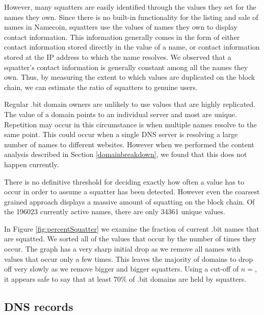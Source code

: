 However, many squatters are easily identified through the values they set for the names they own. Since there is no built-in functionality for the listing and sale of names in Namecoin, squatters use the values of names they own to display contact information. This information generally comes in the form of either contact information stored directly in the value of a name, or contact information stored at the IP address to which the name resolves.  We observed that a squatter's contact information is generally constant among all the names they own. Thus, by measuring the extent to which values are duplicated on the block chain, we can estimate the ratio of squatters to genuine users.

Regular .bit domain owners are unlikely to use values that are highly replicated. The value of a domain points to an individual server and most are unique. Repetition may occur in this circumstance is when multiple names resolve to the same point. This could occur when a single DNS server is resolving a large number of names to different websites. However when we performed the content analysis described in Section \ref{domainbreakdown}, we found that this does not happen currently.

There is no definitive threshold for deciding exactly how often a value has to occur in order to assume a squatter has been detected. However even the coarsest grained approach displays a massive amount of squatting on the block chain. Of the 196023 currently active names, there are only 34361 unique values.

In Figure \ref{fig:percentSquatter} we examine the fraction of current .bit names that are squatted. We sorted all of the values that occur by the number of times they occur. 
The graph has a very sharp initial drop as we remove all names with values that occur only a few times. This leaves the majority of domains to drop off very slowly as we remove bigger and bigger squatters. Using a cut-off of $n=$, it appears safe to say that at least 70\% of .bit domains are held by squatters.

\subsection{DNS records}


